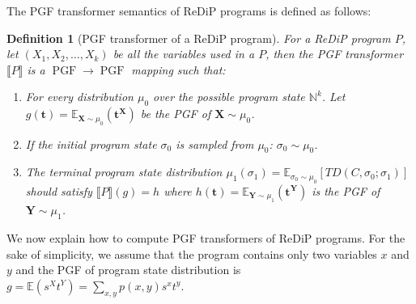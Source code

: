 \documentclass[a4paper]{article}
\DeclareMathOperator*{\PGF}{PGF}
\renewcommand{\S}[1]{ \llbracket #1 \rrbracket }
\newcommand{\E}{ \mathbb{E} }
\newtheorem{definition}[theorem]{Definition}
\begin{document}
The PGF transformer semantics of ReDiP programs is defined as follows:
\begin{definition}[PGF transformer of a ReDiP program]
	For a ReDiP program \(P\), let \((X_1,X_2,\ldots,X_k)\) be all the variables used in a \(P\),
	then the PGF transformer \(\S{P}\) is a \(\PGF\to\PGF\) mapping such that:
	\begin{enumerate}
		\item For every distribution \(\mu_0\) over the possible program state \(\mathbb{N}^k\).
		      Let \(g(\mathbf{t}) = \E_{\mathbf{X}\sim\mu_0}(\mathbf{t}^\mathbf{X})\) be the PGF of \(\mathbf{X}\sim\mu_0\).
		\item If the initial program state \(\sigma_0\) is sampled from \(\mu_0\): \(\sigma_0 \sim \mu_0\).
		\item The terminal program state distribution \( \mu_1(\sigma_1) = \E_{\sigma_0\sim \mu_0}\left[ TD(C,\sigma_0;\sigma_1) \right] \)
		      should satisfy \(\S{P}(g) = h\) where \(h(\mathbf{t}) = \E_{\mathbf{Y}\sim\mu_1}(\mathbf{t}^\mathbf{Y})\) is the PGF of \(\mathbf{Y}\sim\mu_1\).
	\end{enumerate}
\end{definition}
We now explain how to compute PGF transformers of ReDiP programs.
For the sake of simplicity, we assume that the program contains only two variables \(x\) and \(y\) and the PGF of program state distribution is \(g=\E(s^X t^Y)=\sum_{x,y} p(x,y) s^x t^y\).
\end{document}

